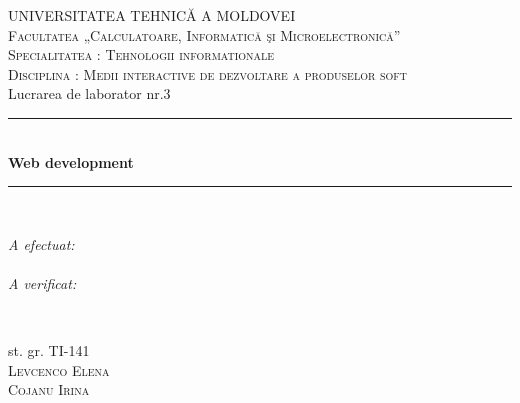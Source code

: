 \documentclass[12pt]{article}
\begin{document}
\begin{titlepage}

\newcommand{\HRule}{\rule{\linewidth}{0.5mm}} %

\center %
 

\textsc{\Large UNIVERSITATEA TEHNICĂ A MOLDOVEI}\\[1cm] %
\textsc{\Large Facultatea „Calculatoare, Informatică şi Microelectronică”}\\[0.5cm] %
\textsc{\large Specialitatea : Tehnologii informationale}\\[0.5cm] %

\textsc{\large Disciplina : Medii interactive de dezvoltare a produselor soft}\\[1.5cm] %
\large Lucrarea de laborator nr.3\\[1cm]

\HRule \\[0.4cm]
{ \huge \bfseries Web development}\\[0.2cm] %
\HRule \\[3cm]
 

\begin{minipage}{0.4\textwidth}
\begin{flushleft} \large
\emph{A efectuat:}\\
\emph{}\\
\emph{A verificat:}\\
\end{flushleft}
\end{minipage}
~
\begin{minipage}{0.4\textwidth}
\begin{flushright} \large
st. gr. TI-141 \\
\textsc{Levcenco Elena}\\ %
\textsc{ Cojanu Irina} %
\end{flushright}
\end{minipage}\\[3cm]


\end{titlepage}
\end{document}

